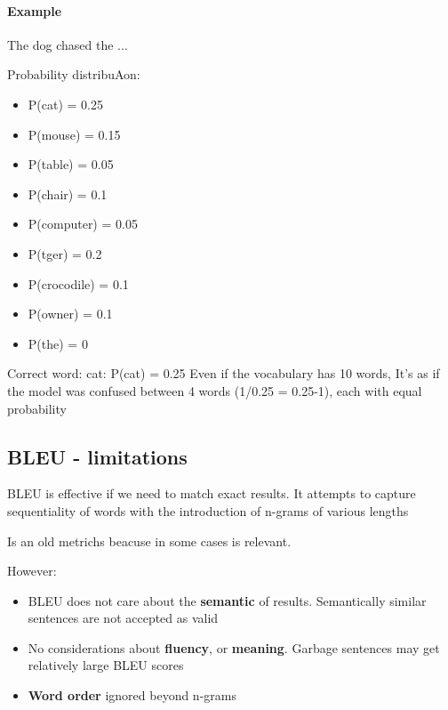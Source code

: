 \paragraph{Example} The dog chased the ...

Probability distribuAon:

\begin{itemize}
  \item P(cat) = 0.25

  \item P(mouse) = 0.15
  \item P(table) = 0.05

  \item P(chair) = 0.1

  \item P(computer) = 0.05
  \item P(tger) = 0.2
  \item P(crocodile) = 0.1

  \item P(owner) = 0.1

  \item P(the) = 0

\end{itemize}

Correct word: cat: P(cat) = 0.25
Even if the vocabulary has 10
words, It's as if the model was
confused between 4 words
(1/0.25 = 0.25-1), each with
equal probability


\subsection{BLEU - limitations}

BLEU is effective if we need to match exact results.
It attempts to capture sequentiality of words with the introduction of
n-grams of various lengths

Is an old metrichs beacuse in some cases is relevant.

However:

\begin{itemize}
  \item BLEU does not care about the \textbf{semantic} of results. Semantically similar sentences are not accepted as valid
  \item  No considerations about \textbf{fluency}, or \textbf{meaning}. Garbage sentences may get relatively large BLEU scores
  \item  \textbf{Word order} ignored beyond n-grams
\end{itemize}


